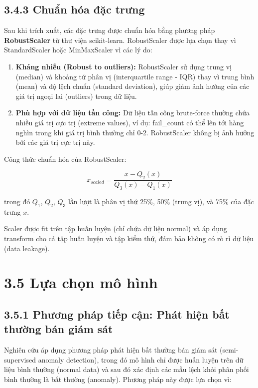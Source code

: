 \documentclass[
  a4paper]{report}
\begin{document}
\subsection{3.4.3 Chuẩn hóa đặc
trưng}\label{chuux1ea9n-huxf3a-ux111ux1eb7c-trux1b0ng}

Sau khi trích xuất, các đặc trưng được chuẩn hóa bằng phương pháp
\textbf{RobustScaler} từ thư viện scikit-learn. RobustScaler được lựa
chọn thay vì StandardScaler hoặc MinMaxScaler vì các lý do:

\begin{enumerate}
\def\labelenumi{\arabic{enumi}.}
\item
  \textbf{Kháng nhiễu (Robust to outliers):} RobustScaler sử dụng trung
  vị (median) và khoảng tứ phân vị (interquartile range - IQR) thay vì
  trung bình (mean) và độ lệch chuẩn (standard deviation), giúp giảm ảnh
  hưởng của các giá trị ngoại lai (outliers) trong dữ liệu.
\item
  \textbf{Phù hợp với dữ liệu tấn công:} Dữ liệu tấn công brute-force
  thường chứa nhiều giá trị cực trị (extreme values), ví dụ: fail\_count
  có thể lên tới hàng nghìn trong khi giá trị bình thường chỉ 0-2.
  RobustScaler không bị ảnh hưởng bởi các giá trị cực trị này.
\end{enumerate}

Công thức chuẩn hóa của RobustScaler:

\[x_{scaled} = \frac{x - Q_2(x)}{Q_3(x) - Q_1(x)}\]

trong đó \(Q_1\), \(Q_2\), \(Q_3\) lần lượt là phân vị thứ 25\%, 50\%
(trung vị), và 75\% của đặc trưng \(x\).

Scaler được fit trên tập huấn luyện (chỉ chứa dữ liệu normal) và áp dụng
transform cho cả tập huấn luyện và tập kiểm thử, đảm bảo không có rò rỉ
dữ liệu (data leakage).

\section{3.5 Lựa chọn mô hình}\label{lux1ef1a-chux1ecdn-muxf4-huxecnh}

\subsection{3.5.1 Phương pháp tiếp cận: Phát hiện bất thường bán giám
sát}\label{phux1b0ux1a1ng-phuxe1p-tiux1ebfp-cux1eadn-phuxe1t-hiux1ec7n-bux1ea5t-thux1b0ux1eddng-buxe1n-giuxe1m-suxe1t}

Nghiên cứu áp dụng phương pháp phát hiện bất thường bán giám sát
(semi-supervised anomaly detection), trong đó mô hình chỉ được huấn
luyện trên dữ liệu bình thường (normal data) và sau đó xác định các mẫu
lệch khỏi phân phối bình thường là bất thường (anomaly). Phương pháp này
được lựa chọn vì:
\end{document}
